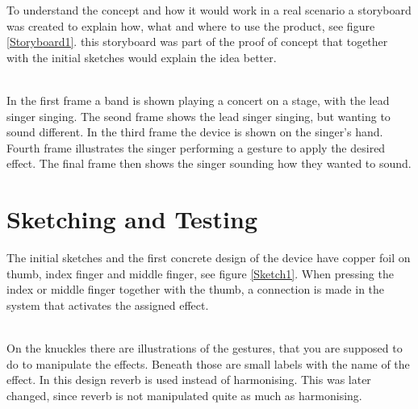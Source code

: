 To understand the concept and how it would work in a real scenario a storyboard was created to explain how, what and where to use the product, see figure \ref{Storyboard1}. this storyboard was part of the proof of concept that together with the initial sketches would explain the idea better.\\

\begin{minipage}{\linewidth}%
\label{Storyboard1}
\end{minipage}\\

In the first frame a band is shown playing a concert on a stage, with the lead singer singing. The seond frame shows the lead singer singing, but wanting to sound different. In the third frame the device is shown on the singer's hand. Fourth frame illustrates the singer performing a gesture to apply the desired effect. The final frame then shows the singer sounding how they wanted to sound.

\section{Sketching and Testing}

The initial sketches and the first concrete design of the device have copper foil on thumb, index finger and middle finger, see figure \ref{Sketch1}. When pressing the index or middle finger together with the thumb, a connection is made in the system that activates the assigned effect. \\

\begin{minipage}{\linewidth}%
\label{Sketch1}
\end{minipage}\\

On the knuckles there are illustrations of the gestures, that you are supposed to do to manipulate the effects. Beneath those are small labels with the name of the effect. In this design reverb is used instead of harmonising. This was later changed, since reverb is not manipulated quite as much as harmonising.

